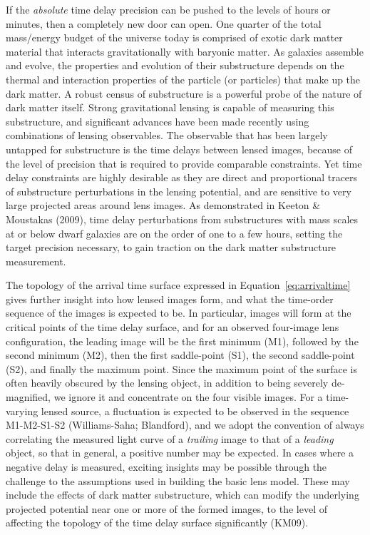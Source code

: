 \documentclass[iop]{emulateapj}
\begin{document}
If the \emph{absolute} time delay precision can be pushed to the
levels of hours or minutes, then a completely new door can open.  One
quarter of the total mass/energy budget of the universe today is
comprised of exotic dark matter material that interacts
gravitationally with baryonic matter. As galaxies assemble and evolve,
the properties and evolution of their substructure depends on the
thermal and interaction properties of the particle (or particles) that
make up the dark matter. A robust census of substructure is a powerful
probe of the nature of dark matter itself. Strong gravitational
lensing is capable of measuring this substructure, and significant
advances have been made recently using combinations of lensing
observables. The observable that has been largely untapped for
substructure is the time delays between lensed images, because of the
level of precision that is required to provide comparable
constraints. Yet time delay constraints are highly desirable as they
are direct and proportional tracers of substructure perturbations in
the lensing potential, and are sensitive to very large projected areas
around lens images. As demonstrated in Keeton \& Moustakas (2009),
time delay perturbations from substructures with mass scales at or
below dwarf galaxies are on the order of one to a few hours, setting
the target precision necessary, to gain traction on the dark matter
substructure measurement.

The topology of the arrival time surface expressed in
Equation~\ref{eq:arrivaltime} gives further insight into how lensed
images form, and what the time-order sequence of the images is
expected to be. In particular, images will form at the critical points
of the time delay surface, and for an observed four-image lens
configuration, the leading image will be the first minimum (M1),
followed by the second minimum (M2), then the first saddle-point (S1),
the second saddle-point (S2), and finally the maximum point. Since the
maximum point of the surface is often heavily obscured by the lensing
object, in addition to being severely de-magnified, we ignore it and
concentrate on the four visible images.  For a time-varying lensed
source, a fluctuation is expected to be observed in the sequence
M1-M2-S1-S2 (Williams-Saha; Blandford), and we adopt the convention of
always correlating the measured light curve of a \emph{trailing} image
to that of a \emph{leading} object, so that in general, a positive
number may be expected. In cases where a negative delay is measured,
exciting insights may be possible through the challenge to the
assumptions used in building the basic lens model.  These may include
the effects of dark matter substructure, which can modify the
underlying projected potential near one or more of the formed images,
to the level of affecting the topology of the time delay surface
significantly (KM09).
\end{document}
